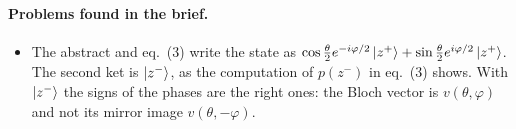 \documentclass[11pt]{article}
\begin{document}
\paragraph{Problems found in the brief.}
\begin{itemize}
\item The abstract and eq.~(3) write the state as $\cos\frac\theta2 e^{-i\varphi/2}\ket{z^+}
  + \sin\frac\theta2 e^{i\varphi/2}\ket{z^+}$. The second ket is $\ket{z^-}$, as the computation
  of $p(z^-)$ in eq.~(3) shows. With $\ket{z^-}$ the signs of the phases are the right ones: the
  Bloch vector is $v(\theta,\varphi)$ and not its mirror image $v(\theta,-\varphi)$.
\end{itemize}
\end{document}

